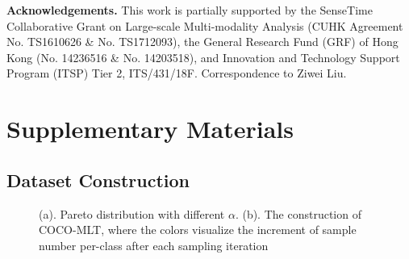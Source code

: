 \documentclass[runningheads]{llncs}
\begin{document}
\noindent\textbf{Acknowledgements.}
This work is partially supported by the SenseTime Collaborative Grant on Large-scale Multi-modality Analysis (CUHK Agreement No. TS1610626 \& No. TS1712093), the General Research Fund (GRF) of Hong Kong (No. 14236516 \& No. 14203518), and Innovation and Technology Support Program (ITSP) Tier 2, ITS/431/18F. Correspondence to Ziwei Liu.
 

 

\clearpage
\appendix
\section{Supplementary Materials}
\label{supplement}
\subsection{Dataset Construction}

\begin{figure}[hb] 
     \hfill
    \caption{
        (a). Pareto distribution with different $\alpha$.
        (b). The construction of COCO-MLT, where the colors visualize the increment of sample number per-class after each sampling iteration
    }
\end{figure}
\end{document}

